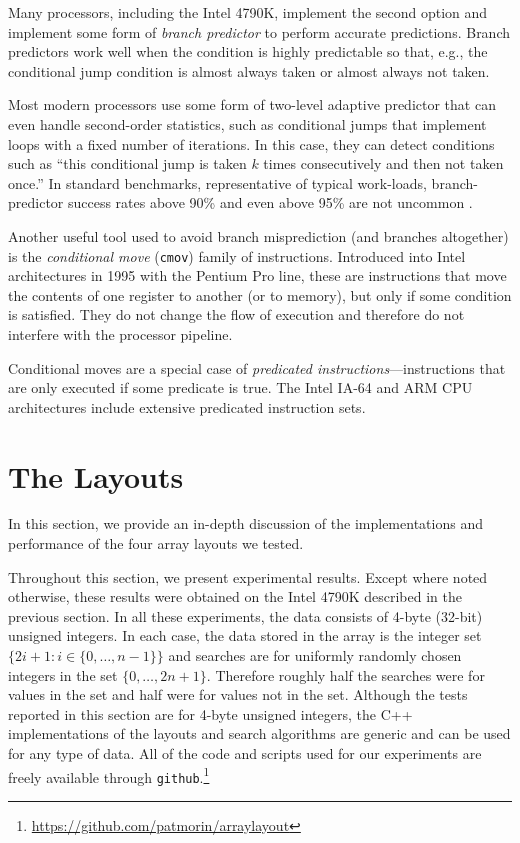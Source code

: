 \documentclass{patmorin}
\begin{document}
Many processors, including the Intel 4790K, implement the second
option and implement some form of \emph{branch predictor} to perform
accurate predictions.  Branch predictors work well when the condition
is highly predictable so that, e.g., the conditional jump condition is
almost always taken or almost always not taken.

Most modern processors use some form of two-level adaptive predictor
\cite{yeh.patt:two-level} that can even handle second-order statistics,
such as conditional jumps that implement loops with a fixed number of
iterations. In this case, they can detect conditions such as ``this
conditional jump is taken $k$ times consecutively and then not taken
once.''  In standard benchmarks, representative of typical work-loads,
branch-predictor success rates above 90\% and even above 95\% are not
uncommon \cite{yeh.patt:alternative}.

Another useful tool used to avoid branch misprediction (and branches
altogether) is the \emph{conditional move} (\texttt{cmov}) family
of instructions.  Introduced into Intel architectures in 1995 with
the Pentium Pro line, these are instructions that move the contents of
one register to another (or to memory), but only if some condition is
satisfied. They do not change the flow of execution and therefore do
not interfere with the processor pipeline.

Conditional moves are a special case of \emph{predicated
instructions}---instructions that are only executed if some predicate
is true.  The Intel IA-64 and ARM CPU architectures include extensive
predicated instruction sets.

\section{The Layouts}

In this section, we provide an in-depth discussion of the implementations
and performance of the four array layouts we tested.

Throughout this section, we present experimental results. Except
where noted otherwise, these results were obtained on the Intel
4790K described in the previous section.  In all these experiments,
the data consists of 4-byte (32-bit) unsigned integers. In each
case, the data stored in the array is the integer set $\{2i+1:
i\in\{0,\ldots,n-1\}\}$ and searches are for uniformly randomly chosen
integers in the set $\{0,\ldots,2n+1\}$.  Therefore roughly half the
searches were for values in the set and half were for values not in
the set.  Although the tests reported in this section are for 4-byte
unsigned integers, the C++ implementations of the layouts and search
algorithms are generic and can be used for any type of data. All of the
code and scripts used for our experiments are freely available through
\texttt{github}.\footnote{\url{https://github.com/patmorin/arraylayout}}
\end{document}
